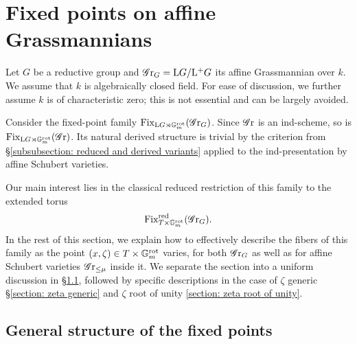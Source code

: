 

\section{Fixed points on affine Grassmannians}\label{section: fixed points on affine grassmannians}

Let $G$ be a reductive group and $\operatorname{\mathscr{G}r}_G = \mathrm{L} G / \mathrm{L^+} G$ its affine Grassmannian over $k$. We assume that $k$ is algebraically closed field. For ease of discussion, we further assume $k$ is of characteristic zero; this is not essential and can be largely avoided.

Consider the fixed-point family $\operatorname{Fix}_{\mathrm{L} G \rtimes \mathbb{G}_m^{\mathrm{rot}}}(\operatorname{\mathscr{G}r}_G)$. Since $\operatorname{\mathscr{G}r}$ is an ind-scheme, so is $\operatorname{Fix}_{\mathrm{L} G \rtimes \mathbb{G}_m^{\mathrm{rot}}}(\operatorname{\mathscr{G}r})$.
Its natural derived structure is trivial by the criterion from \S \ref{subsubsection: reduced and derived variants} applied to the ind-presentation by affine Schubert varieties.


Our main interest lies in the classical reduced restriction of this family to the extended torus
\begin{equation*}
    \operatorname{Fix}^{\operatorname{red}}_{T \times \mathbb{G}_m^{\mathrm{rot}}}(\operatorname{\mathscr{G}r}_G).
\end{equation*}
In the rest of this section, we explain how to effectively describe the fibers of this family as the point $(x, \zeta) \in T \times \mathbb{G}_m^{\mathrm{rot}}$ varies, for both $\operatorname{\mathscr{G}r}_G$ as well as for affine Schubert varieties $\operatorname{\mathscr{G}r}_{\leq \mu}$ inside it.
%
We separate the section into a uniform discussion in \S \ref{section: general structure of the fixed points}, followed by specific descriptions in the case of $\zeta$ generic \S \ref{section: zeta generic} and $\zeta$ root of unity \ref{section: zeta root of unity}.





\subsection{General structure of the fixed points}\label{section: general structure of the fixed points}

